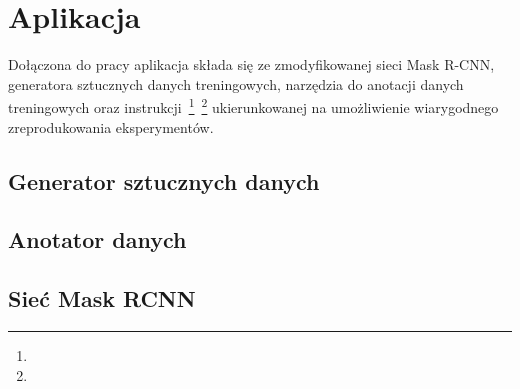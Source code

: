 \chapter{Aplikacja}

Dołączona do pracy aplikacja składa się ze zmodyfikowanej sieci Mask R-CNN, generatora sztucznych danych treningowych, narzędzia do anotacji danych treningowych oraz instrukcji~\footnote{}~\footnote{} ukierunkowanej na umożliwienie wiarygodnego zreprodukowania eksperymentów.
\\

\section{Generator sztucznych danych}


\section{Anotator danych}


\section{Sieć Mask RCNN}

